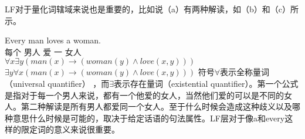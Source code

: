 LF对于量化词辖域来说也是重要的，比如说（a）有两种解读，如（b）和（c）所示。

\eal
\label{Beispiel-Every-man-loves-a-woman}
\ex 
\gll Every man loves a woman.\\
每个 男人 爱 一 女人\\
\ex $\forall x \exists y (man(x) \to (woman(y) \wedge love(x,y)))$
\ex $\exists y \forall x (man(x) \to (woman(y) \wedge love(x,y)))$
\zl
符号$\forall$\isc{$\forall$}\is{$\forall$}表示全称量词（universal quantifier） ，而$\exists$\isc{$\exists$}\is{$\exists$}表示存在量词（existential
quantifier）。第一个公式是指对于每一个男人来说，都有一个他爱的女人，当然他们爱的可以是不同的女人。第二种解读是所有男人都爱同一个女人。至于什么时候会造成这种歧义以及哪种意思什么时候是可能的，取决于给定话语的句法属性。LF层对于像a和every这样的限定词的意义来说很重要。

